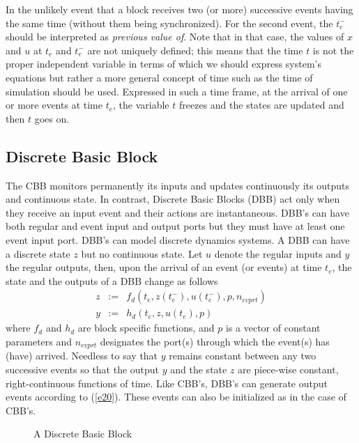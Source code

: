 \documentclass{book}
\begin{document}
\bigskip

In the unlikely event that a block receives two (or more)
successive events having the same time (without them being
synchronized). For the
second event, the $t_e^-$ should be interpreted as {\em previous value of}.
Note that in that case, the values of $x$ and $u$ at $t_e$ and $t_e^-$ are not uniquely defined;
this means that the time $t$ is not the proper independent variable in terms
of which we should express system's equations but rather a more general concept
of time such as the time of simulation should be used. 
Expressed in such a time frame, 
at the arrival of one or more events at time $t_e$, the variable $t$ freezes 
and the states are updated and then $t$ goes on. 



\subsection{Discrete Basic Block}
The CBB monitors permanently its inputs and updates continuously its
outputs and continuous state. In 
contrast, Discrete Basic Blocks (DBB) act only when they receive an input
event and their actions are instantaneous. 
DBB's can have both regular and event input and output
ports but they must have at least one event input port. DBB's can model discrete 
dynamics systems. A DBB can have a discrete state
$z$ but no continuous state. Let $u$ denote the regular inputs and $y$ the regular
outputs, then, upon the arrival of an event (or events) at time $t_e$, 
the state and the outputs of a DBB change as follows
\begin{eqnarray}
z&:=& f_d(t_e,z(t_e^-),u(t_e^-),p,n_{evprt})  \label{e520} \\
y&:=&h_d(t_e,z,u(t_e),p) \label{e530}
\end{eqnarray}
where $f_d$ and $h_d$ are block specific functions, and $p$ is a vector of
constant parameters and $n_{evprt}$ designates the port(s)
through which the event(s) has (have) arrived.
Needless to say that $y$ remains constant between any two successive
events so that the output $y$ and the state $z$ are
piece-wise constant, right-continuous functions of time.
Like CBB's, DBB's can generate output events according to (\ref{e20}). These
events can also be initialized as in the case of CBB's.


\begin{figure}[ht]

\caption{A Discrete Basic Block}
\label{dbb}
\end{figure}
\end{document}

